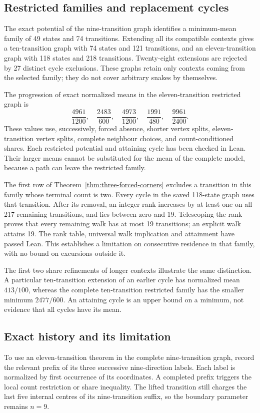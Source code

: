 \documentclass[11pt,a4paper]{article}
\theoremstyle{definition}
\theoremstyle{remark}
\begin{document}
\subsection{Restricted families and replacement cycles}\label{sec:restricted-family}
The exact potential of the nine-transition graph identifies a minimum-mean family of 49 states and 74 transitions. Extending all its compatible contexts gives a ten-transition graph with 74 states and 121 transitions, and an eleven-transition graph with 118 states and 218 transitions. Twenty-eight extensions are rejected by 27 distinct cycle exclusions. These graphs retain only contexts coming from the selected family; they do not cover arbitrary snakes by themselves.

The progression of exact normalized means in the eleven-transition restricted graph is
\[
\frac{4961}{1200},\quad\frac{2483}{600},\quad
\frac{4973}{1200},\quad\frac{1991}{480},\quad
\frac{9961}{2400}.
\]
These values use, successively, forced absence, shorter vertex splits, eleven-transition vertex splits, complete neighbour choices, and count-conditioned shares. Each restricted potential and attaining cycle has been checked in Lean. Their larger means cannot be substituted for the mean of the complete model, because a path can leave the restricted family.

The first row of Theorem~\ref{thm:three-forced-corners} excludes a transition in this family whose terminal count is two. Every cycle in the saved 118-state graph uses that transition. After its removal, an integer rank increases by at least one on all 217 remaining transitions, and lies between zero and 19. Telescoping the rank proves that every remaining walk has at most 19 transitions; an explicit walk attains 19. The rank table, universal walk implication and attainment have passed Lean. This establishes a limitation on consecutive residence in that family, with no bound on excursions outside it.

The first two share refinements of longer contexts illustrate the same distinction. A particular ten-transition extension of an earlier cycle has normalized mean $413/100$, whereas the complete ten-transition restricted family has the smaller minimum $2477/600$. An attaining cycle is an upper bound on a minimum, not evidence that all cycles have its mean.

\subsection{Exact history and its limitation}\label{sec:history-recognition}
To use an eleven-transition theorem in the complete nine-transition graph, record the relevant prefix of its three successive nine-direction labels. Each label is normalized by first occurrence of its coordinates. A completed prefix triggers the local count restriction or share inequality. The lifted transition still charges the last five internal centres of its nine-transition suffix, so the boundary parameter remains $n=9$.
\end{document}

